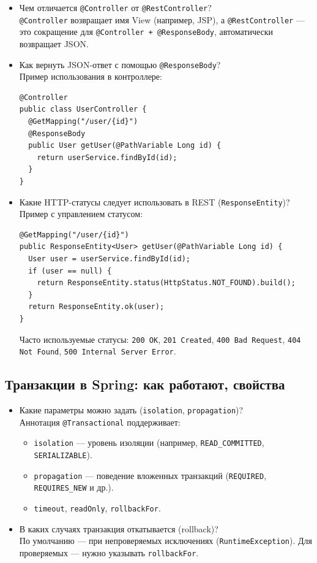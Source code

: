 \documentclass[a4paper,14pt]{article}
\begin{document}
\begin{itemize}
\item Чем отличается \texttt{@Controller} от \texttt{@RestController}? \\
\texttt{@Controller} возвращает имя View (например, JSP), а \texttt{@RestController} — это сокращение для \texttt{@Controller + @ResponseBody}, автоматически возвращает JSON.

\item Как вернуть JSON-ответ с помощью \texttt{@ResponseBody}? \\
Пример использования в контроллере:
\begin{lstlisting}[style=javastyle]
@Controller
public class UserController {
  @GetMapping("/user/{id}")
  @ResponseBody
  public User getUser(@PathVariable Long id) {
    return userService.findById(id);
  }
}
\end{lstlisting}

\item Какие HTTP-статусы следует использовать в REST (\texttt{ResponseEntity})? \\
Пример с управлением статусом:
\begin{lstlisting}[style=javastyle]
@GetMapping("/user/{id}")
public ResponseEntity<User> getUser(@PathVariable Long id) {
  User user = userService.findById(id);
  if (user == null) {
    return ResponseEntity.status(HttpStatus.NOT_FOUND).build();
  }
  return ResponseEntity.ok(user);
}
\end{lstlisting}
Часто используемые статусы: \texttt{200 OK}, \texttt{201 Created}, \texttt{400 Bad Request}, \texttt{404 Not Found}, \texttt{500 Internal Server Error}.
\end{itemize}

\subsection{Транзакции в Spring: как работают, свойства}

\begin{itemize}
\item Какие параметры можно задать (\texttt{isolation}, \texttt{propagation})? \\
Аннотация \texttt{@Transactional} поддерживает:
\begin{itemize}
  \item \texttt{isolation} — уровень изоляции (например, \texttt{READ\_COMMITTED}, \texttt{SERIALIZABLE}).
  \item \texttt{propagation} — поведение вложенных транзакций (\texttt{REQUIRED}, \texttt{REQUIRES\_NEW} и др.).
  \item \texttt{timeout}, \texttt{readOnly}, \texttt{rollbackFor}.
\end{itemize}

\item В каких случаях транзакция откатывается (rollback)? \\
По умолчанию — при непроверяемых исключениях (\texttt{RuntimeException}). Для проверяемых — нужно указывать \texttt{rollbackFor}.
\end{itemize}
\end{document}
